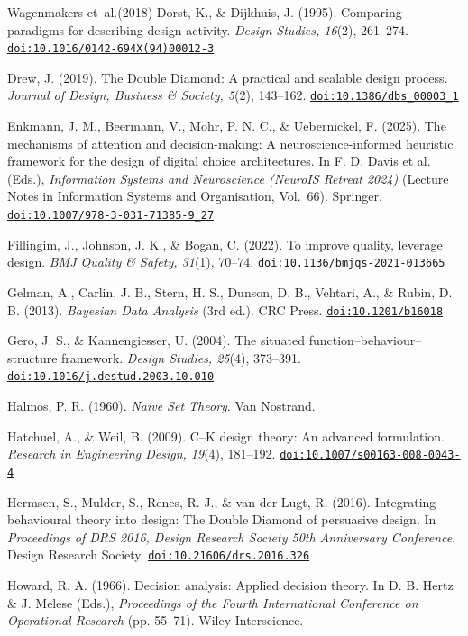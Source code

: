 \documentclass[11pt]{article}
\providecommand{\doi}[1]{\href{https://doi.org/#1}{\nolinkurl{doi:#1}}}
\begin{document}
\begin{thebibliography}{Wagenmakers et~al.(2018)}
 Dorst, K., \& Dijkhuis, J. (1995). Comparing paradigms for describing design activity. \textit{Design Studies, 16}(2), 261--274. \doi{10.1016/0142-694X(94)00012-3}

 Drew, J. (2019). The Double Diamond: A practical and scalable design process. \textit{Journal of Design, Business \& Society, 5}(2), 143--162. \doi{10.1386/dbs_00003_1}

 Enkmann, J. M., Beermann, V., Mohr, P. N. C., \& Uebernickel, F. (2025). The mechanisms of attention and decision-making: A neuroscience-informed heuristic framework for the design of digital choice architectures. In F. D. Davis et al. (Eds.), \textit{Information Systems and Neuroscience (NeuroIS Retreat 2024)} (Lecture Notes in Information Systems and Organisation, Vol.\ 66). Springer. \doi{10.1007/978-3-031-71385-9_27}

 Fillingim, J., Johnson, J. K., \& Bogan, C. (2022). To improve quality, leverage design. \textit{BMJ Quality \& Safety, 31}(1), 70--74. \doi{10.1136/bmjqs-2021-013665}

 Gelman, A., Carlin, J. B., Stern, H. S., Dunson, D. B., Vehtari, A., \& Rubin, D. B. (2013). \textit{Bayesian Data Analysis} (3rd ed.). CRC Press. \doi{10.1201/b16018}

 Gero, J. S., \& Kannengiesser, U. (2004). The situated function--behaviour--structure framework. \textit{Design Studies, 25}(4), 373--391. \doi{10.1016/j.destud.2003.10.010}

 Halmos, P. R. (1960). \textit{Naive Set Theory}. Van Nostrand.

 Hatchuel, A., \& Weil, B. (2009). C--K design theory: An advanced formulation. \textit{Research in Engineering Design, 19}(4), 181--192. \doi{10.1007/s00163-008-0043-4}

 Hermsen, S., Mulder, S., Renes, R. J., \& van der Lugt, R. (2016). Integrating behavioural theory into design: The Double Diamond of persuasive design. In \textit{Proceedings of DRS 2016, Design Research Society 50th Anniversary Conference}. Design Research Society. \doi{10.21606/drs.2016.326}

 Howard, R. A. (1966). Decision analysis: Applied decision theory. In D. B. Hertz \& J. Melese (Eds.), \textit{Proceedings of the Fourth International Conference on Operational Research} (pp. 55--71). Wiley-Interscience.


\end{thebibliography}
\end{document}
